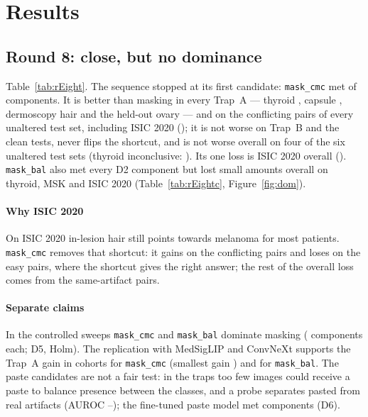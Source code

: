 \section{Results}
\subsection{Round 8: close, but no dominance}
Table~\ref{tab:rEight}. The sequence stopped at its first candidate: \texttt{mask\_cmc} met \sNineMetmaskcmc{} of
\sNineNComp{} components. It is better than masking in every Trap~A --- thyroid \sNineCmcDTwoTrapthyroid, capsule
\sNineCmcDTwoTrapcapsule, dermoscopy hair \sNineCmcDTwoTrapisic{} and the held-out ovary \sNineCmcDTwoTrapovary{} --- and
on the conflicting pairs of every unaltered test set, including ISIC 2020 (\sNineCmcDTwohardisicTwoZeroTwoZero); it is not
worse on Trap~B and the clean tests, never flips the shortcut, and is not worse overall on four of the six unaltered test
sets (thyroid inconclusive: \sNineCmcDOneallthyroid). Its one loss is ISIC 2020 overall (\sNineCmcDOneallisicTwoZeroTwoZero).
\texttt{mask\_bal} also met every D2 component but lost small amounts overall on thyroid, MSK and ISIC 2020
(Table~\ref{tab:rEightc}, Figure~\ref{fig:dom}).


\paragraph{Why ISIC 2020} On ISIC 2020 in-lesion hair still points towards melanoma for most patients. \texttt{mask\_cmc}
removes that shortcut: it gains \sNineCmcIsicTwoZerohard{} on the conflicting pairs and loses \sNineCmcIsicTwoZeroeasy{} on
the easy pairs, where the shortcut gives the right answer; the rest of the overall loss comes from the same-artifact
pairs.
\paragraph{Separate claims} In the controlled sweeps \texttt{mask\_cmc} and \texttt{mask\_bal} dominate masking
(\sNineDFivemaskcmc{} components each; D5, Holm). The replication with MedSigLIP and ConvNeXt supports the Trap~A gain in
\sNineRepmaskcmc{} cohorts for \texttt{mask\_cmc} (smallest gain \sNineRepMinmaskcmc) and \sNineRepmaskbal{} for
\texttt{mask\_bal}. The paste candidates are not a fair test: in the traps too few images could receive a paste to balance
presence between the classes, and a probe separates pasted from real artifacts (AUROC \sNineProbeMin--\sNineProbeMax); the
fine-tuned paste model met \sNineDSix{} components (D6).

